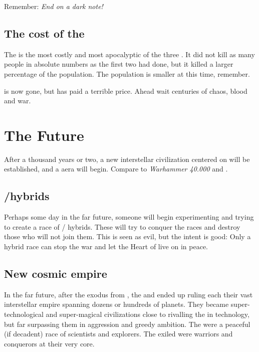 Remember: \emph{End on a dark note!}









\subsection{The cost of the \thirdbanewar}
The \thirdbanewar{} is the most costly and most apocalyptic of the three \banewars. 
It did not kill as many people in absolute numbers as the first two had done, but it killed a larger percentage of the population. 
The population is smaller at this time, remember. 

\Daggerrain{} is now gone, but \Miith{} has paid a terrible price. 
Ahead wait centuries of chaos, blood and war. 














\section{The Future}
After a thousand years or two, a new interstellar civilization centered on \Miith{} will be established, and a  aera will begin. Compare to \emph{Warhammer 40.000} and . 









\subsection{\Resphan/\dragon hybrids}
Perhaps some day in the far future, someone will begin experimenting and trying to create a race of \resphan/\dragon{} hybrids. 
These will try to conquer the races and destroy those who will not join them. 
This is seen as evil, but the intent is good: 
Only a hybrid race can stop the war and let the Heart of \Miith{} live on in peace. 









\subsection{New cosmic empire}
In the far future, after the exodus from \Miith, the \dragons and \resphain ended up ruling each their vast interstellar empire spanning dozens or hundreds of planets. 
They became super-technological and super-magical civilizations close to rivalling the \voyagers in technology, but far surpassing them in aggression and greedy ambition. 
The \voyagers were a peaceful (if decadent) race of scientists and explorers. 
The exiled \Miithians were warriors and conquerors at their very core.

